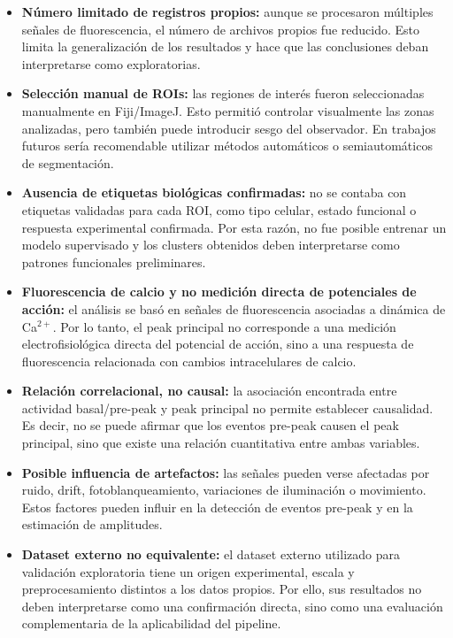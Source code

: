 \documentclass[10pt,twocolumn]{article}
\begin{document}
\begin{itemize}
    \item \textbf{Número limitado de registros propios:} aunque se procesaron múltiples señales de fluorescencia, el número de archivos propios fue reducido. Esto limita la generalización de los resultados y hace que las conclusiones deban interpretarse como exploratorias.

    \item \textbf{Selección manual de ROIs:} las regiones de interés fueron seleccionadas manualmente en Fiji/ImageJ. Esto permitió controlar visualmente las zonas analizadas, pero también puede introducir sesgo del observador. En trabajos futuros sería recomendable utilizar métodos automáticos o semiautomáticos de segmentación.

    \item \textbf{Ausencia de etiquetas biológicas confirmadas:} no se contaba con etiquetas validadas para cada ROI, como tipo celular, estado funcional o respuesta experimental confirmada. Por esta razón, no fue posible entrenar un modelo supervisado y los clusters obtenidos deben interpretarse como patrones funcionales preliminares.

    \item \textbf{Fluorescencia de calcio y no medición directa de potenciales de acción:} el análisis se basó en señales de fluorescencia asociadas a dinámica de Ca$^{2+}$. Por lo tanto, el peak principal no corresponde a una medición electrofisiológica directa del potencial de acción, sino a una respuesta de fluorescencia relacionada con cambios intracelulares de calcio.

    \item \textbf{Relación correlacional, no causal:} la asociación encontrada entre actividad basal/pre-peak y peak principal no permite establecer causalidad. Es decir, no se puede afirmar que los eventos pre-peak causen el peak principal, sino que existe una relación cuantitativa entre ambas variables.

    \item \textbf{Posible influencia de artefactos:} las señales pueden verse afectadas por ruido, drift, fotoblanqueamiento, variaciones de iluminación o movimiento. Estos factores pueden influir en la detección de eventos pre-peak y en la estimación de amplitudes.

    \item \textbf{Dataset externo no equivalente:} el dataset externo utilizado para validación exploratoria tiene un origen experimental, escala y preprocesamiento distintos a los datos propios. Por ello, sus resultados no deben interpretarse como una confirmación directa, sino como una evaluación complementaria de la aplicabilidad del pipeline.
\end{itemize}
\end{document}
